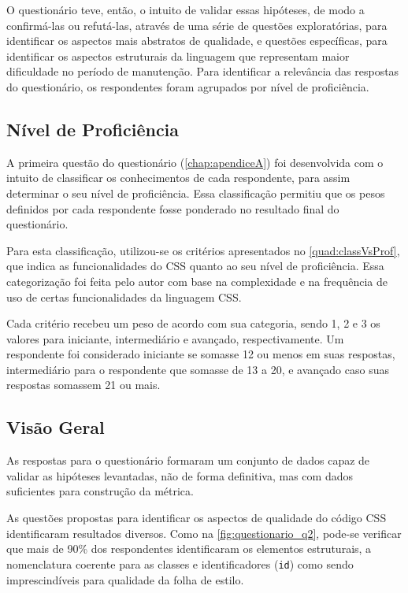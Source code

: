 O questionário teve, então, o intuito de validar essas hipóteses, de modo a confirmá-las ou refutá-las, através de uma série de questões exploratórias, para identificar os aspectos mais abstratos de qualidade, e questões específicas, para identificar os aspectos estruturais da linguagem que representam maior dificuldade no período de manutenção. Para identificar a relevância das respostas do questionário, os respondentes foram agrupados por nível de proficiência.

\subsection{Nível de Proficiência}

A primeira questão do questionário (\autoref{chap:apendiceA}) foi desenvolvida com o intuito de classificar os conhecimentos de cada respondente, para assim determinar o seu nível de proficiência. Essa classificação permitiu que os pesos definidos por cada respondente fosse ponderado no resultado final do questionário.

Para esta classificação, utilizou-se os critérios apresentados no \autoref{quad:classVsProf}, que indica as funcionalidades do CSS quanto ao seu nível de proficiência. Essa categorização foi feita pelo autor com base na complexidade e na frequência de uso de certas funcionalidades da linguagem CSS.



Cada critério recebeu um peso de acordo com sua categoria, sendo 1, 2 e 3 os valores para iniciante, intermediário e avançado, respectivamente. Um respondente foi considerado iniciante se somasse 12 ou menos em suas respostas, intermediário para o respondente que somasse de 13 a 20, e avançado caso suas respostas somassem 21 ou mais. 

\subsection{Visão Geral}

As respostas para o questionário formaram um conjunto de dados capaz de validar as hipóteses levantadas, não de forma definitiva, mas com dados suficientes para construção da métrica.

As questões propostas para identificar os aspectos de qualidade do código CSS identificaram resultados diversos. Como na \autoref{fig:questionario_q2}, pode-se verificar que mais de 90\% dos respondentes identificaram os elementos estruturais, a nomenclatura coerente para as classes e identificadores (\texttt{id}) como sendo imprescindíveis para qualidade da folha de estilo.

